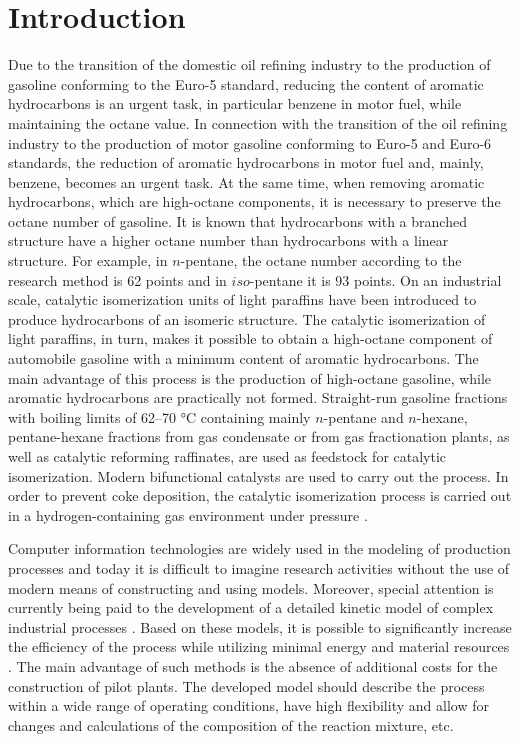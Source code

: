 \documentclass[mathematics,article,accept,pdftex,moreauthors]{Definitions/mdpi}
\begin{document}
	
	\section{Introduction}
	
	Due to the transition of the domestic oil refining industry to the production of gasoline conforming to the Euro-5 standard, reducing the content of aromatic hydrocarbons is an urgent task, in particular benzene in motor fuel, while maintaining the octane value. In connection with the transition of the oil refining industry to the production of motor gasoline conforming to Euro-5 and Euro-6 standards, the reduction of aromatic hydrocarbons in motor fuel and, mainly, benzene, becomes an urgent task. At the same time, when removing aromatic hydrocarbons, which are high-octane components, it is necessary to preserve the octane number of gasoline. It is known that hydrocarbons with a branched structure have a higher octane number than hydrocarbons with a linear structure. For example, in $n$-pentane, the octane number according to the research method is 62 points and in $iso$-pentane it is 93 points. On an industrial scale, catalytic isomerization units of light paraffins have been introduced to produce hydrocarbons of an isomeric structure. The catalytic isomerization of light paraffins, in turn, makes it possible to obtain a high-octane component of automobile gasoline with a minimum content of aromatic hydrocarbons. The main advantage of this process is the production of high-octane gasoline, while aromatic hydrocarbons are practically not formed. Straight-run gasoline fractions with boiling limits of 62--70 °C containing mainly $n$-pentane and $n$-hexane, pentane-hexane fractions from gas condensate or from gas fractionation plants, as well as catalytic reforming raffinates, are used as feedstock for catalytic isomerization. Modern bifunctional catalysts are used to carry out the process. In order to prevent coke deposition, the catalytic isomerization process is carried out in a hydrogen-containing gas environment under pressure \cite{Hartmut, Fahim, Meyers}.
	
	Computer information technologies are widely used in the modeling of production processes and today it is difficult to imagine research activities without the use of modern means of constructing and using models. Moreover, special attention is currently being paid to the development of a detailed kinetic model of complex industrial processes \cite{DAO2022172, SAJID20207430, LI2021175, HOU201759}. Based on these models, it is possible to significantly increase the efficiency of the process while utilizing minimal energy and material resources \cite{uskovfibrous, en13133393}. The main advantage of such methods is the absence of additional costs for the construction of pilot plants. The developed model should describe the process within a wide range of operating conditions, have high flexibility and allow for changes and calculations of the composition of the reaction mixture, etc.
	
\end{document}
